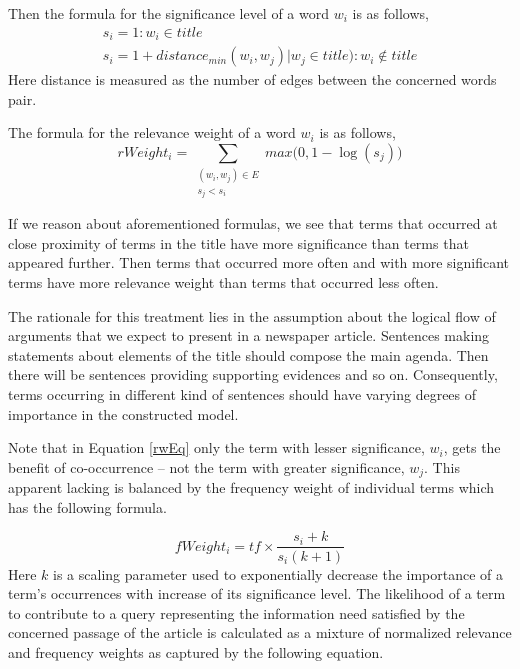\documentclass[article]{IEEEtran}
\begin{document}
Then the formula for the significance level of a word $w_i$ is as follows, 
\begin{equation}
\begin{array}{lr}
s_i = 1 : w_i \in title \\
s_i = 1 + distance_{min}(w_i, w_j) | w_j \in title) : w_i \notin title
\end{array}
\end{equation}
Here distance is measured as the number of edges between the concerned words pair.  

The formula for the relevance weight of a word $w_i$ is as follows, 
\begin{equation}
\label{rwEq}
rWeight_i = \sum_{\substack{(w_i, w_j) \in E\\s_j < s_i}} max\big(0, 1 - \log(s_j)\big)
\end{equation}
 

If we reason about aforementioned formulas, we see that terms that occurred at close proximity of terms in the title have more significance than terms that appeared further. Then terms that occurred more often and with more significant terms have more relevance weight than terms that occurred less often.  

The rationale for this treatment lies in the assumption about the logical flow of arguments that we expect to present in a newspaper article. Sentences making statements about elements of the title should compose the main agenda. Then there will be sentences providing supporting evidences and so on. Consequently, terms occurring in different kind of sentences should have varying degrees of importance in the constructed model.   

Note that in Equation \ref{rwEq} only the term with lesser significance, $w_i$, gets the benefit of co-occurrence -- not the term with greater significance, $w_j$. This apparent lacking is balanced by the frequency weight of individual terms which has the following formula.

\begin{equation}
fWeight_i = tf \times {\frac{s_i + k}{s_i (k + 1)}}
\end{equation}   
Here $k$ is a scaling parameter used to exponentially decrease the importance of a term's occurrences with increase of its significance level.
The likelihood of a term to contribute to a query representing the information need satisfied by the concerned passage of the article is calculated as a mixture of normalized relevance and frequency weights as captured by the following equation.
\end{document}
